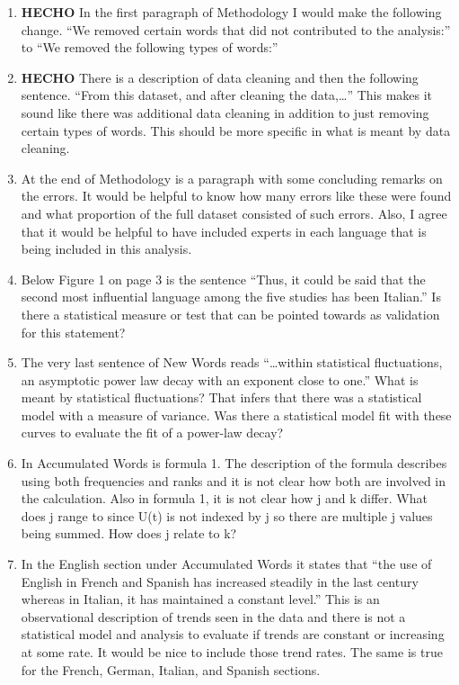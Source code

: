 \documentclass{article}
\begin{document}
\begin{enumerate}
		\item \textbf{HECHO}  In the first paragraph of Methodology I would make the following
		change. “We removed certain words that did not contributed to the
		analysis:” to “We removed the following types of words:”
		
		\item  \textbf{HECHO} There is a description of data cleaning and then the following
		sentence. “From this dataset, and after cleaning the data,…” This
		makes it sound like there was additional data cleaning in addition to
		just removing certain types of words. This should be more specific in
		what is meant by data cleaning.
		
		\item At the end of Methodology is a paragraph with some concluding
		remarks on the errors. It would be helpful to know how many errors
		like these were found and what proportion of the full dataset
		consisted of such errors. Also, I agree that it would be helpful to
		have included experts in each language that is being included in this
		analysis.
		
		\item Below Figure 1 on page 3 is the sentence “Thus, it could be said
		that the second most influential language among the five studies has
		been Italian.” Is there a statistical measure or test that can be
		pointed towards as validation for this statement?
		
		\item The very last sentence of New Words reads “…within statistical
		fluctuations, an asymptotic power law decay with an exponent close to
		one.” What is meant by statistical fluctuations? That infers that
		there was a statistical model with a measure of variance. Was there a
		statistical model fit with these curves to evaluate the fit of a
		power-law decay?
		
		\item  In Accumulated Words is formula 1. The description of the formula
		describes using both frequencies and ranks and it is not clear how
		both are involved in the calculation. Also in formula 1, it is not
		clear how j and k differ. What does j range to since U(t) is not
		indexed by j so there are multiple j values being summed. How does j
		relate to k?
		
		\item In the English section under Accumulated Words it states that “the
		use of English in French and Spanish has increased steadily in the
		last century whereas in Italian, it has maintained a constant level.”
		This is an observational description of trends seen in the data and
		there is not a statistical model and analysis to evaluate if trends
		are constant or increasing at some rate. It would be nice to include
		those trend rates. The same is true for the French, German, Italian,
		and Spanish sections.
		

\end{enumerate}
\end{document}
